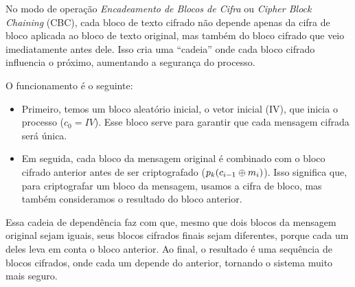 No modo de operação {\em Encadeamento de Blocos de Cifra} ou {\em Cipher Block Chaining} (CBC), cada bloco de texto cifrado não depende apenas da cifra de bloco aplicada ao bloco de texto original, mas também do bloco cifrado que veio imediatamente antes dele.
Isso cria uma ``cadeia'' onde cada bloco cifrado influencia o próximo, aumentando a segurança do processo.

O funcionamento é o seguinte:

\begin{itemize}
\item Primeiro, temos um bloco aleatório inicial, o vetor inicial (IV), que inicia o processo ($c_0 = IV$).
  Esse bloco serve para garantir que cada mensagem cifrada será única.
\item Em seguida, cada bloco da mensagem original é combinado com o bloco cifrado anterior antes de ser criptografado ($p_k(c_{i-1} \oplus m_i)$).
  Isso significa que, para criptografar um bloco da mensagem, usamos a cifra de bloco, mas também consideramos o resultado do bloco anterior.
\end{itemize}

Essa cadeia de dependência faz com que, mesmo que dois blocos da mensagem original sejam iguais, seus blocos cifrados finais sejam diferentes, porque cada um deles leva em conta o bloco anterior.
Ao final, o resultado é uma sequência de blocos cifrados, onde cada um depende do anterior, tornando o sistema muito mais seguro.

\begin{center}
\end{center}


